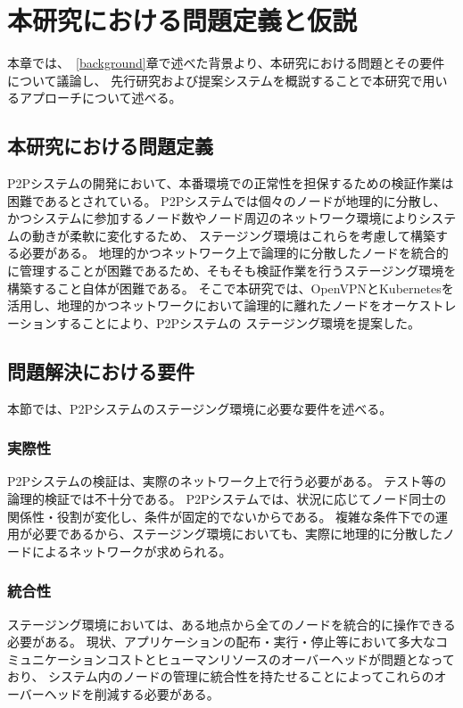 \chapter{本研究における問題定義と仮説}
\label{issue}

本章では、~\ref{background}章で述べた背景より、本研究における問題とその要件について議論し、
先行研究および提案システムを概説することで本研究で用いるアプローチについて述べる。

\section{本研究における問題定義}
\label{issue:definition}
P2Pシステムの開発において、本番環境での正常性を担保するための検証作業は困難であるとされている。
P2Pシステムでは個々のノードが地理的に分散し、かつシステムに参加するノード数やノード周辺のネットワーク環境によりシステムの動きが柔軟に変化するため、
ステージング環境はこれらを考慮して構築する必要がある。
地理的かつネットワーク上で論理的に分散したノードを統合的に管理することが困難であるため、そもそも検証作業を行うステージング環境を構築すること自体が困難である。
そこで本研究では、OpenVPNとKubernetesを活用し、地理的かつネットワークにおいて論理的に離れたノードをオーケストレーションすることにより、P2Pシステムの
ステージング環境を提案した。

\section{問題解決における要件}
\label{issue:requirements}
本節では、P2Pシステムのステージング環境に必要な要件を述べる。

\subsection{実際性}
\label{issue:requirements1}
P2Pシステムの検証は、実際のネットワーク上で行う必要がある。
テスト等の論理的検証では不十分である。
P2Pシステムでは、状況に応じてノード同士の関係性・役割が変化し、条件が固定的でないからである。
複雑な条件下での運用が必要であるから、ステージング環境においても、実際に地理的に分散したノードによるネットワークが求められる。

\subsection{統合性}
\label{issue:requirements2}
ステージング環境においては、ある地点から全てのノードを統合的に操作できる必要がある。
現状、アプリケーションの配布・実行・停止等において多大なコミュニケーションコストとヒューマンリソースのオーバーヘッドが問題となっており、
システム内のノードの管理に統合性を持たせることによってこれらのオーバーヘッドを削減する必要がある。

